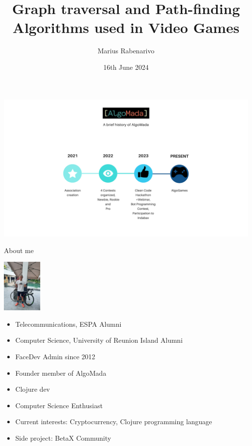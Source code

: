 \documentclass[ignorenonframetext,]{beamer}
\title{Graph traversal and Path-finding Algorithms used in Video Games}
\author{Marius Rabenarivo}
\date{16th June 2024}
\providecommand{\tightlist}{%
  \setlength{\itemsep}{0pt}\setlength{\parskip}{0pt}}
\begin{document}
\frame{\titlepage}

\begin{frame}

\includegraphics{AlgoMada.png}

\end{frame}

\begin{frame}{About me}
\protect\hypertarget{about-me}{}

\includegraphics[width=\textwidth,height=1.04167in]{marius.jpg}

\begin{itemize}
\tightlist
\item
  Telecommunications, ESPA Alumni
\item
  Computer Science, University of Reunion Island Alumni
\item
  FaceDev Admin since 2012
\item
  Founder member of AlgoMada
\item
  Clojure dev
\item
  Computer Science Enthusiast
\item
  Current interests: Cryptocurrency, Clojure programming language
\item
  Side project: BetaX Community
\end{itemize}

\end{frame}
\end{document}
